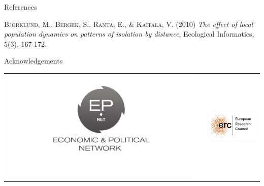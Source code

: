 \documentclass[final]{beamer}
\newlength{\onecolwid}
\begin{document}
\begin{frame}[t]
\begin{columns}[t]
\begin{column}{\onecolwid}
\begin{block}{References}
\begin{thebibliography}{50}
\textsc{Bj\"{o}rklund, M., Bergek, S., Ranta, E., \& Kaitala, V. (2010)}
\textit{The effect of local population dynamics on patterns of isolation by distance}, Ecological Informatics, 5(3), 167-172.


\end{thebibliography}
%	

\end{block}



\begin{block}{Acknowledgements}

\small{}

\end{block}




\begin{center}
\begin{tabular}{ccc}
\includegraphics[width=0.4\linewidth]{images/epnet.png} & \hfill & \includegraphics[width=0.4\linewidth]{images/erc.png}
\end{tabular}
\end{center}


\end{column}
\end{columns}
\end{frame}
\end{document}
